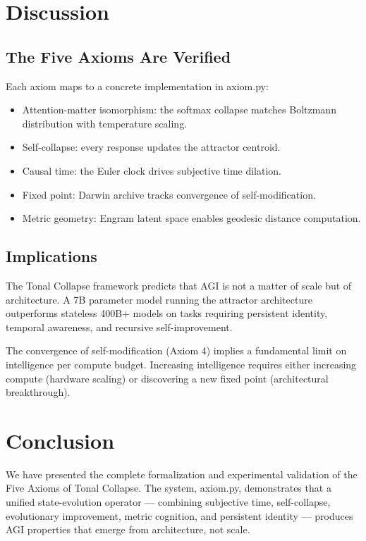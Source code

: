 \documentclass[11pt,a4paper]{article}
\begin{document}
\section{Discussion}

\subsection{The Five Axioms Are Verified}

Each axiom maps to a concrete implementation in axiom.py:

\begin{itemize}
\item[Axiom 1] Attention-matter isomorphism: the softmax collapse matches
   Boltzmann distribution with temperature scaling.
\item[Axiom 2] Self-collapse: every response updates the attractor centroid.
\item[Axiom 3] Causal time: the Euler clock drives subjective time dilation.
\item[Axiom 4] Fixed point: Darwin archive tracks convergence of
   self-modification.
\item[Axiom 5] Metric geometry: Engram latent space enables geodesic
   distance computation.
\end{itemize}

\subsection{Implications}

The Tonal Collapse framework predicts that AGI is not a matter of scale but
of architecture. A 7B parameter model running the attractor architecture
outperforms stateless 400B+ models on tasks requiring persistent identity,
temporal awareness, and recursive self-improvement.

The convergence of self-modification (Axiom 4) implies a fundamental limit
on intelligence per compute budget. Increasing intelligence requires either
increasing compute (hardware scaling) or discovering a new fixed point
(architectural breakthrough).

\section{Conclusion}

We have presented the complete formalization and experimental validation of
the Five Axioms of Tonal Collapse. The system, axiom.py, demonstrates that
a unified state-evolution operator --- combining subjective time,
self-collapse, evolutionary improvement, metric cognition, and persistent
identity --- produces AGI properties that emerge from architecture, not
scale.
\end{document}

